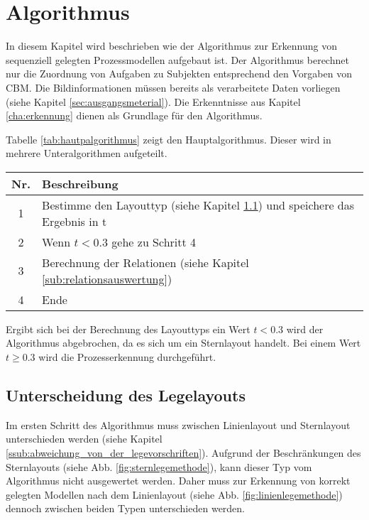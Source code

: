 %
%
% 
% 
% 

\chapter{Algorithmus} 
\label{cap:algorithmus}
In diesem Kapitel wird beschrieben wie der Algorithmus zur Erkennung von sequenziell gelegten Prozessmodellen aufgebaut ist. Der Algorithmus berechnet nur die Zuordnung von Aufgaben zu Subjekten entsprechend den Vorgaben von CBM. Die Bildinformationen müssen bereits als verarbeitete Daten vorliegen (siehe Kapitel \ref{sec:ausgangsmeterial}). Die Erkenntnisse aus Kapitel \ref{cha:erkennung} dienen als Grundlage für den Algorithmus.

Tabelle \ref{tab:hautpalgorithmus} zeigt den Hauptalgorithmus. Dieser wird in mehrere Unteralgorithmen aufgeteilt. 

\begin{center}
	\label{tab:hautpalgorithmus}
	\begin{tabularx}
		{1.0\linewidth}{ c X } \textbf{Nr.} & \textbf{Beschreibung} \\
		\hline 1 & Bestimme den Layouttyp (siehe Kapitel  \ref{sub:unterscheidung_der_legemethoden}) und speichere das Ergebnis in t\\
		\hline 2 & Wenn $t < 0.3$ gehe zu Schritt 4 \\
		\hline 3 & Berechnung der Relationen (siehe Kapitel \ref{sub:relationsauswertung})\\
		\hline 4 & Ende
	\end{tabularx}
\end{center}

Ergibt sich bei der Berechnung des Layouttyps ein Wert $t<0.3$ wird der Algorithmus abgebrochen, da es sich um ein Sternlayout handelt. Bei einem Wert $t \geq 0.3$ wird die Prozesserkennung durchgeführt. 

\section{Unterscheidung des Legelayouts} %
\label{sub:unterscheidung_der_legemethoden}
Im ersten Schritt des Algorithmus muss zwischen Linienlayout und Sternlayout unterschieden werden (siehe Kapitel \ref{ssub:abweichung_von_der_legevorschriften}). Aufgrund der Beschränkungen des Sternlayouts (siehe Abb. \ref{fig:sternlegemethode}), kann dieser Typ vom Algorithmus nicht ausgewertet werden. Daher muss zur Erkennung von korrekt gelegten Modellen nach dem Linienlayout (siehe Abb. \ref{fig:linienlegemethode}) dennoch zwischen beiden Typen unterschieden werden.

